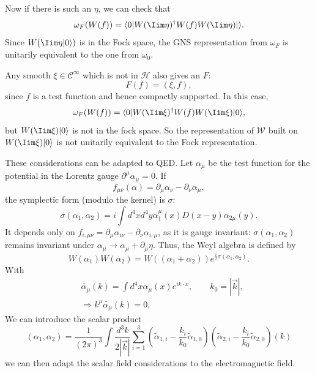 Now if there is such an $\eta$, we can check that
\begin{equation}
\omega_F (W (f))= \langle 0| W (\Iim \eta)^\dagger W (f)W (\Iim \eta)|\rangle. \label{chap1-eq2-24}
\end{equation}
Since $W(\Iim \eta | 0 \rangle)$ is in the Fock space, the GNS representation from $\omega_F$ is unitarily equivalent to the one from $\omega_0$.

Any smooth $\xi \in \mathcal{C}^\infty$ which is not in $\mathcal{H}$ also gives an $F$:
\begin{equation}
  F(f)= (\xi, f), \label{chap1-eq2.25}
\end{equation}
since $f$ is a test function and hence compactly supported. In this case,
\begin{equation}
\omega_F (W(f))= \langle 0| W (\Iim \xi)^\dagger W (f)W (\Iim \xi)|0\rangle, \label{chap1-eq2.26}
\end{equation}
but $W (\Iim \xi)|0 \rangle$ is not in the fock space. So the representation of $\mathcal{W}$ built on $W (\Iim \xi)|0 \rangle$ is not unitarily equivalent to the Fock representation.

These considerations can be adapted to QED. Let $\alpha_\mu$ be the test function for the potential in the Lorentz gauge $\partial^\mu \alpha_\mu =0$. If
\begin{equation}
f_{\mu \nu} (\alpha) = \partial_{\mu} \alpha_{\nu}- \partial_\nu \alpha_\mu, \label{chap1-eq-2.27}
\end{equation}
the symplectic form (modulo the kernel) is $\sigma:$
\begin{equation}
  \sigma (\alpha_1, \alpha_2) = i \int d^4 x d^4 y \alpha^\mu_1 (x) D (x-y) \alpha_{2 \mu} (y). \label{chap1-eq2.28}
\end{equation}
It depends only on $f_{i, \mu \nu}= \partial_\mu \alpha_{i \nu}- \partial_\nu \alpha_{i, \mu}$, as it is gauge invariant: $\sigma(\alpha_1, \alpha_2)$ remains invariant under $\alpha_\mu \to \alpha_\mu + \partial_{\mu} \eta$. Thus, the Weyl algebra is defined by
\begin{equation}
W (\alpha_1) W (\alpha_2)= W ((\alpha_1 + \alpha_2)) e^{\frac{i}{2} \sigma(\alpha_1, \alpha_2)}. \label{chap1-eq2.29}
\end{equation}
With
\begin{align}
  &\tilde{\alpha_\mu} (k) = \int d^4 x \alpha_\mu (x)e^{ik\cdot x}, \qquad k_0 = |\overrightarrow{k}|,\label{chap1-eq2.30}\\
  &\Longrightarrow k^{\mu} \tilde{\alpha_\mu} (k)=0,\label{chap1-eq2.31}
\end{align}
We can introduce the scalar product
\begin{equation}
(\alpha_1, \alpha_2)= \frac{1}{(2\pi)^3} \int \frac{d^3 k}{2|\overrightarrow{k}|} \sum^3_{i=1} \left(\overline{\tilde{\alpha}}_{1, i} -  \frac{k_i}{k_0} \overline{\tilde{\alpha}}_{1, 0}\right) (\tilde{\alpha}_{2, i}- \frac{k_i}{k_0} \tilde{\alpha}_{2, 0})(k) \label{chap1-eq2.32}
\end{equation}
we can then adapt the scalar field considerations to the electromagnetic field.

